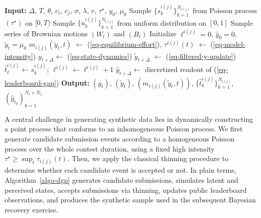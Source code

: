 \documentclass[mnsc]{informs3}
\begin{document}
\begin{algorithm}[!ht]
\caption{Synthetic Data Simulation}
\label{algo-dgp}
\begin{algorithmic}
\STATE \textbf{Input:}
	$\Delta$, $T$, $\theta$, $c_i$, $c_j$, $\sigma$, $\lambda$, $r$, $\tau^\star$, $y_0$, $\mu_0$
\STATE Sample $\{s_k^{i(j)}\}^{N_{i(j)}}_{k=1}$ from Poisson process $(\tau^\star)$ on $[0, T)$
\STATE Sample $\{u_k^{i(j)}\}^{N_{i(j)}}_{k=1}$ from uniform distribution on $[0, 1]$
\STATE Sample series of Brownian motions $(W_t)$ and $(B_t)$
\STATE Initialize $\ell^{i(j)}=0$, $\hat{y}_0 = 0$, $\tilde{y}_t=\mu_0$
    \STATE $m_{i(j)}(\tilde{y}_t, t)$  $\gets$ (\ref{eq-equilibrium-effort}), $\tau^{i(j)}(t)$ $\gets$ (\ref{eq-model-intensity})
    \hfill {}
    \STATE $y_{t+\Delta} \gets$ (\ref{eq-state-dynamics})
    \hfill {}
    \STATE $\tilde{y}_{t+\Delta}$ $\gets$ (\ref{eq-filtered-y-update})
    \hfill {}
    \FOR{$s_{k}^{i(j)} \in [t, t+\Delta)$}
        	    \STATE $\hat{t}^{i(j)}_{\ell} \gets s_{k}^{i(j)}$; $\ell^{i(j)} \gets \ell^{i(j)}+1$
	    \hfill {}
	    \STATE $\hat{y}_{t+\Delta} \gets $ discretized readout of (\ref{eq-leaderboard-gap})
	    \hfill {}
        \ENDIF
    \ENDFOR
\ENDFOR
\STATE \textbf{Output:} $(y_t)$, $(\tilde{y}_t)$, $(m_{i(j)}(\tilde{y}_t, t))$, $\{\hat{t}_k^{i(j)}\}^{N_{i(j)}}_{k=1}$, $(\hat{y}_{t_k})_{k=1}^{N_i + N_j}$
\end{algorithmic}
\end{algorithm}

A central challenge in generating synthetic data lies in dynamically constructing a point process that conforms to an inhomogeneous Poisson process.
We first generate candidate submission events according to a homogeneous Poisson process over the whole contest duration, using a fixed high intensity $\tau^\star \ge \sup_t \tau_{i(j)}(t)$.
Then, we apply the classical thinning procedure \citep{lewis1979simulation} to determine whether each candidate event is accepted or not.
In plain terms, Algorithm~\ref{algo-dgp} generates candidate submissions, simulates latent and perceived states, accepts submissions via thinning, updates public leaderboard observations, and produces the synthetic sample used in the subsequent Bayesian recovery exercise.
\end{document}
